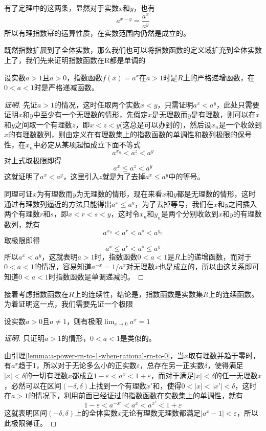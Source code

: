 有了定理中的这两条，显然对于实数$x$和$y$，也有
\[ a^{x-y} = \frac{a^x}{a^y} \]
所以有理指数幂的运算性质，在实数范围内仍然是成立的。

既然指数扩展到了全体实数，那么我们也可以将指数函数的定义域扩充到全体实数上了，我们先来证明指数函数在R都是单调的

\begin{theorem}
  设实数$a>1$且$a>0$，指数函数$f(x)=a^x$在$a>1$时是$R$上的严格递增函数，在$0<a<1$时是严格递减函数。
\end{theorem}

\begin{proof}[证明]
  先证$a>1$的情况，这时任取两个实数$x<y$，只需证明$a^x<a^y$，此处只需要证明$x$和$y$中至少有一个无理数的情形，先假定$x$是无理数而$y$是有理数，则可以在$x$和$y$之间取一个有理数$z$，即$x<z<y$(这总是可以办到的)，然后设$x_n$是一个收敛到$x$的有理数数列，则由定义在有理数集上的指数函数的单调性和数列极限的保号性，在$x_n$中必定从某项起恒成立下面不等式
  \[ a^{x_n}<a^z<a^y \]
  对上式取极限即得
  \[ a^x \leqslant a^z < a^y \]
  这就证明了$a^x<a^y$，这里引入$z$就是为了去掉$a^x \leqslant a^y$中的等号。

  同理可证$x$为有理数而$y$为无理数的情形，现在来看$x$和$y$都是无理数的情形，这时通过有理数列逼近的方法只能得出$a^x \leqslant a^y$，为了去掉等号，我们在$x$和$y$之间插入两个有理数$r$和$s$，即$x<r<s<y$，这时令$x_n$和$y_n$是两个分别收敛到$x$和$y$的有理数数列，就有
  \[ a^{x_n} < a^r < a^s < a^{y_n} \]
  取极限即得
  \[ a^x \leqslant a^r < a^s \leqslant a^y \]
所以$a^x < a^y$，这就表明$a>1$时，指数函数$0<a<1$是$R$上的递增函数，而对于$0<a<1$的情况，容易知道$a^{-x}=1/a^x$对无理数$x$也是成立的，所以由这关系即可知道$0<a<1$时指数函数是单调递减的。
\end{proof}

接着考虑指数函数在$R$上的连续性，结论是，指数函数是实数集$R$上的连续函数。为着证明这一点，我们需要先证一个极限
\begin{lemma}
  \label{lemma:a-power-x-to-1-when-real-x-to-0}
  设实数$a>0$且$a \neq 1$，则有极限$\lim_{x \to 0} a^x = 1$
\end{lemma}

\begin{proof}[证明]
  只证明$a>1$的情形，$0<a<1$是类似的。

  由引理\autoref{lemma:a-power-rn-to-1-when-rational-rn-to-0}，当$x$取有理数并趋于零时，有$a^x$趋于1，所以对于无论多么小的正实数$\varepsilon$，总存在另一正实数$\delta$，使得满足$|x|<\delta$的一切有理数$x$都成立$1-\varepsilon<a^x<1+\varepsilon$，而对于满足$|x|<\delta$的任一无理数$x$，必然可以在区间$(-\delta,\delta)$上找到一个有理数$x'$和，使得$0<|x|<|x'|<\delta$，这时在$a>1$的情况下，利用前面已经证过的指数函数在实数集上的单调性，就有
  \[ 1-\varepsilon < a^{-x'}<a^x<a^{x'} < 1+\varepsilon \]
  这就表明区间$(-\delta,\delta)$上的全体实数$x$无论有理数无理数都满足$|a^x-1|<\varepsilon$，所以此极限得证。
\end{proof}

